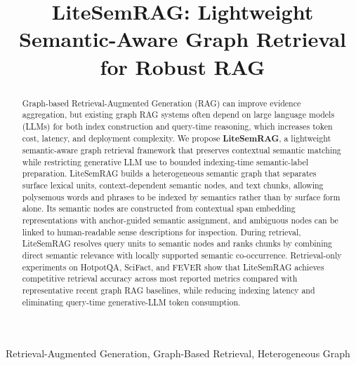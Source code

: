 \documentclass[conference]{IEEEtran}
\begin{document}
\title{LiteSemRAG: Lightweight Semantic-Aware Graph Retrieval for Robust RAG}

\author{}


\maketitle

\begin{abstract}

Graph-based Retrieval-Augmented Generation (RAG) can improve evidence aggregation, but existing graph RAG systems often depend on large language models (LLMs) for both index construction and query-time reasoning, which increases token cost, latency, and deployment complexity. We propose \textbf{LiteSemRAG}, a lightweight semantic-aware graph retrieval framework that preserves contextual semantic matching while restricting generative LLM use to bounded indexing-time semantic-label preparation. LiteSemRAG builds a heterogeneous semantic graph that separates surface lexical units, context-dependent semantic nodes, and text chunks, allowing polysemous words and phrases to be indexed by semantics rather than by surface form alone. Its semantic nodes are constructed from contextual span embedding representations with anchor-guided semantic assignment, and ambiguous nodes can be linked to human-readable sense descriptions for inspection. During retrieval, LiteSemRAG resolves query units to semantic nodes and ranks chunks by combining direct semantic relevance with locally supported semantic co-occurrence. Retrieval-only experiments on HotpotQA, SciFact, and FEVER show that LiteSemRAG achieves competitive retrieval accuracy across most reported metrics compared with representative recent graph RAG baselines, while reducing indexing latency and eliminating query-time generative-LLM token consumption.

\end{abstract}

\begin{IEEEkeywords}
Retrieval-Augmented Generation, Graph-Based Retrieval, Heterogeneous Graph
\end{IEEEkeywords}
\end{document}
